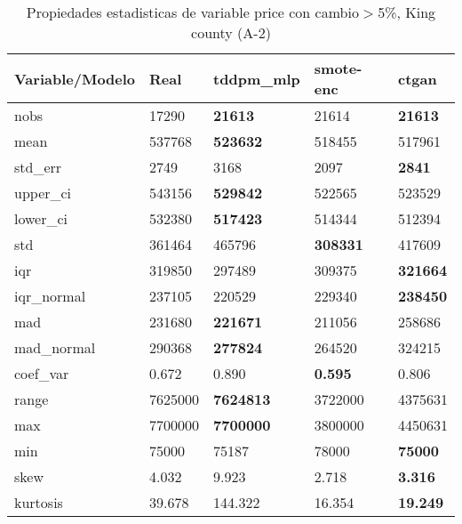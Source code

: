 \begin{table}[H]
\centering
\fontsize{8}{14}\selectfont
\caption{Propiedades estadisticas de variable price con cambio\ensuremath{>}5\%, King county (A-2)}
\label{table-stats-king county-a-2-price-short}
\begin{tabular}{|l|m{10em}|m{10em}|m{10em}|m{10em}|}
\hline
 \rowcolor[gray]{0.8}
Variable/Modelo & Real & tddpm\_mlp & smote-enc & ctgan \\
\hline nobs & 17290 & \bfseries 21613 & \cellcolor[rgb]{0.9, 0.54, 0.52} 21614 & \bfseries 21613 \\
\hline mean & 537768 & \bfseries 523632 & 518455 & \cellcolor[rgb]{0.9, 0.54, 0.52} 517961 \\
\hline std\_err & 2749 & 3168 & \cellcolor[rgb]{0.9, 0.54, 0.52} 2097 & \bfseries 2841 \\
\hline upper\_ci & 543156 & \bfseries 529842 & \cellcolor[rgb]{0.9, 0.54, 0.52} 522565 & 523529 \\
\hline lower\_ci & 532380 & \bfseries 517423 & 514344 & \cellcolor[rgb]{0.9, 0.54, 0.52} 512394 \\
\hline std & 361464 & \cellcolor[rgb]{0.9, 0.54, 0.52} 465796 & \bfseries 308331 & 417609 \\
\hline iqr & 319850 & \cellcolor[rgb]{0.9, 0.54, 0.52} 297489 & 309375 & \bfseries 321664 \\
\hline iqr\_normal & 237105 & \cellcolor[rgb]{0.9, 0.54, 0.52} 220529 & 229340 & \bfseries 238450 \\
\hline mad & 231680 & \bfseries 221671 & 211056 & \cellcolor[rgb]{0.9, 0.54, 0.52} 258686 \\
\hline mad\_normal & 290368 & \bfseries 277824 & 264520 & \cellcolor[rgb]{0.9, 0.54, 0.52} 324215 \\
\hline coef\_var & 0.672 & \cellcolor[rgb]{0.9, 0.54, 0.52} 0.890 & \bfseries 0.595 & 0.806 \\
\hline range & 7625000 & \bfseries 7624813 & \cellcolor[rgb]{0.9, 0.54, 0.52} 3722000 & 4375631 \\
\hline max & 7700000 & \bfseries 7700000 & \cellcolor[rgb]{0.9, 0.54, 0.52} 3800000 & 4450631 \\
\hline min & 75000 & 75187 & \cellcolor[rgb]{0.9, 0.54, 0.52} 78000 & \bfseries 75000 \\
\hline skew & 4.032 & \cellcolor[rgb]{0.9, 0.54, 0.52} 9.923 & 2.718 & \bfseries 3.316 \\
\hline kurtosis & 39.678 & \cellcolor[rgb]{0.9, 0.54, 0.52} 144.322 & 16.354 & \bfseries 19.249 \\

\end{tabular}
\end{table}
